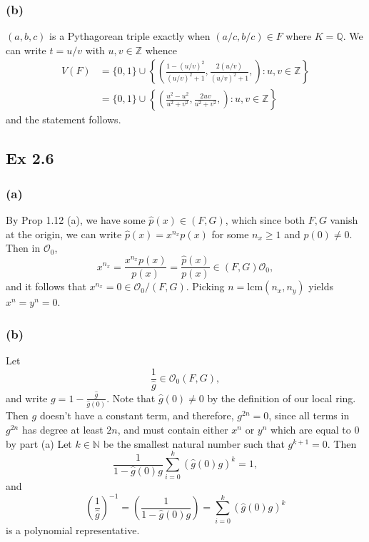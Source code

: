 \documentclass{article}
\theoremstyle{definition}
\newcommand{\Z}{\mathbb{Z}}
\newcommand{\Q}{\mathbb{Q}}
\newcommand{\N}{\mathbb{N}}
\newcommand{\lcm}{\text{lcm}}
\begin{document}
\subsubsection*{(b)}
$(a, b, c)$ is a Pythagorean triple exactly when $(a/c, b/c) \in F$ where $K = \Q$. We
can write $t = u/v$ with $u, v \in \Z$ whence
\begin{align*}
	V(F) 
	&= 
	\{0, 1\} 
	\cup 
	\left\{
		\left(
			\frac{1 - (u/v)^{2}}{(u/v)^{2} + 1}, 
			\frac{2(u/v)}{(u/v)^{2} + 1},
		\right)
		:
		u, v \in \Z
	\right\} \\
	&=
	\{0, 1\}  
	\cup 
	\left\{
		\left(
			\frac{u^{2} - u^{2}}{u^{2} + v^{2}}, 
			\frac{2uv}{u^{2} + v^{2}},
		\right)
		:
		u, v \in \Z
	\right\}
\end{align*}
and the statement follows.


\subsection*{Ex 2.6}

\subsubsection*{(a)}

By Prop 1.12 (a), we have some $\hat{p}(x) \in (F, G)$, which since both $F, G$
vanish at the origin, we can write $\hat{p}(x) = x^{n_x} p(x)$ for some $n_x \geq
1$ and $p(0) \not = 0$. Then in $\mathcal{O}_{0}$,
\[
	x^{n_x} = \frac{x^{n_x}p(x)}{p(x)} = \frac{\hat{p}(x)}{p(x)} \in (F, G)\mathcal{O}_0,
\] 
and it follows that $x^{n_x} = 0 \in \mathcal{O}_{0}/ (F, G)$. Picking $n =
\lcm(n_x, n_y)$ yields $x^{n} = y^{n} = 0$.

\subsubsection*{(b)}

Let 
\[
	\frac{1}{\hat{g}} 
	\in 
	\mathcal{O}_0(F, G),
\] 
and write $g = 1 - \frac{\hat{g}}{\hat{g}(0)}$. Note that $\hat{g}(0) \not = 0$
by the definition of our local ring. Then $g$ doesn't have a constant term, and
therefore, $g^{2n} = 0$, since all terms in $g^{2n}$ has degree at least $2n$,
and must contain either $x^{n}$ or $y^{n}$ which are equal to $0$ by part (a)
Let $k \in \N$ be the smallest natural number such that $g^{k + 1} = 0$. Then
\[
\frac{1}{1 - \hat{g}(0)g} \sum_{i = 0}^{k} \left(\hat{g}(0)g\right)^{k} = 1,
\] 
and
\[
	\left(\frac{1}{\hat{g}}\right)^{-1} 
	= 
	\left(\frac{1}{1 - \hat{g}(0)g}\right) 
	= 
	\sum_{i=0}^{k} \left(\hat{g}(0)g\right)^{k}
\]
is a polynomial representative.
\end{document}

